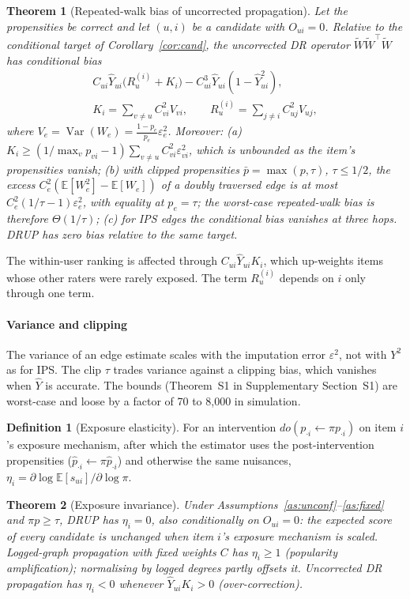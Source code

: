 \documentclass[preprint,review,12pt,authoryear]{elsarticle}
\newtheorem{theorem}{Theorem}
\theoremstyle{definition}
\newtheorem{definition}{Definition}
\newcommand{\E}{\mathbb{E}}
\newcommand{\Var}{\operatorname{Var}}
\newcommand{\tW}{\tilde W}
\begin{document}
\begin{theorem}[Repeated-walk bias of uncorrected propagation]\label{thm:lower}
Let the propensities be correct and let $(u,i)$ be a candidate with $O_{ui}=0$.
Relative to the conditional target of Corollary~\ref{cor:cand}, the
uncorrected DR operator $\tW\tW^\top\tW$ has conditional bias
\begin{gather*}
C_{ui}\hat Y_{ui}\big(R_u^{(i)}+K_i\big)-C_{ui}^3\hat Y_{ui}(1-\hat Y_{ui}^2),\\
K_i=\sum_{v\neq u}C_{vi}^2V_{vi},\qquad R_u^{(i)}=\sum_{j\neq i}C_{uj}^2V_{uj},
\end{gather*}
where $V_e=\Var(W_e)=\frac{1-p_e}{p_e}\varepsilon_e^2$. Moreover:
(a) $K_i\ge(1/\max_vp_{vi}-1)\sum_{v\neq u}C_{vi}^2\varepsilon_{vi}^2$, which is unbounded
as the item's propensities vanish;
(b) with clipped propensities $\bar p=\max(p,\tau)$, $\tau\le1/2$, the excess
$C_e^2(\E[W_e^2]-\E[W_e])$ of a doubly traversed edge is at most
$C_e^2(1/\tau-1)\varepsilon_e^2$, with equality at $p_e=\tau$; the worst-case
repeated-walk bias is therefore $\Theta(1/\tau)$;
(c) for IPS edges the conditional bias vanishes at three hops.
DRUP has zero bias relative to the same target.
\end{theorem}
The within-user ranking is affected through $C_{ui}\hat Y_{ui}K_i$, which
up-weights items whose other raters were rarely exposed. The term $R_u^{(i)}$ depends on
$i$ only through one term.

\paragraph{Variance and clipping} The variance of an edge estimate scales with the
imputation error $\varepsilon^2$, not with $Y^2$ as for IPS. The clip $\tau$ trades
variance against a clipping bias, which vanishes when $\hat Y$ is accurate. The bounds
(Theorem~S1 in Supplementary Section~S1) are worst-case and loose by a factor of 70 to
8{,}000 in simulation.

\begin{definition}[Exposure elasticity]\label{def:elast}
For an intervention $do(p_{\cdot i}\leftarrow\pi p_{\cdot i})$ on item $i$'s
exposure mechanism, after which the estimator uses the post-intervention
propensities ($\hat p_{\cdot i}\leftarrow\pi\hat p_{\cdot i}$) and otherwise the same
nuisances, $\eta_i=\partial\log\E[s_{ui}]/\partial\log\pi$.
\end{definition}

\begin{theorem}[Exposure invariance]\label{thm:fair}
Under Assumptions~\ref{as:unconf}--\ref{as:fixed} and $\pi p\ge\tau$, DRUP has
$\eta_i=0$, also conditionally on $O_{ui}=0$: the expected score of every
candidate is unchanged when item $i$'s exposure mechanism is scaled.
Logged-graph propagation with fixed weights $C$ has $\eta_i\ge1$ (popularity
amplification); normalising by logged degrees partly offsets it.
Uncorrected DR propagation has $\eta_i<0$ whenever $\hat Y_{ui}K_i>0$
(over-correction).
\end{theorem}
\end{document}
